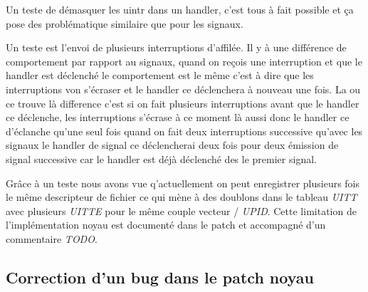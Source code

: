 Un teste de démasquer les uintr dans un handler, c'est tous à fait possible et ça pose des problématique similaire que pour les signaux.

Un teste est l'envoi de plusieurs interruptions d'affilée.
Il y à une différence de comportement par rapport au signaux, quand on reçois une interruption et que le handler est déclenché le comportement est le même c'est à dire que les interruptions von s'écraser et le handler ce déclenchera à nouveau une fois.
La ou ce trouve là difference c'est si on fait plusieurs interruptions avant que le handler ce déclenche, les interruptions s'écrase à ce moment là aussi donc le handler ce d'éclanche qu'une seul fois quand on fait deux interruptions successive qu'avec les signaux le handler de signal ce déclencherai deux fois pour deux émission de signal successive car le handler est déjà déclenché des le premier signal.

Grâce à un teste nous avons vue q'actuellement on peut enregistrer plusieurs fois le même descripteur de fichier ce qui mène à des doublons dans le tableau \emph{UITT} avec plusieurs \emph{UITTE} pour le même couple vecteur / \emph{UPID}.
Cette limitation de l'implémentation noyau est documenté dans le patch et accompagné d'un commentaire \emph{TODO}.

\subsection{Correction d'un bug dans le patch noyau}

